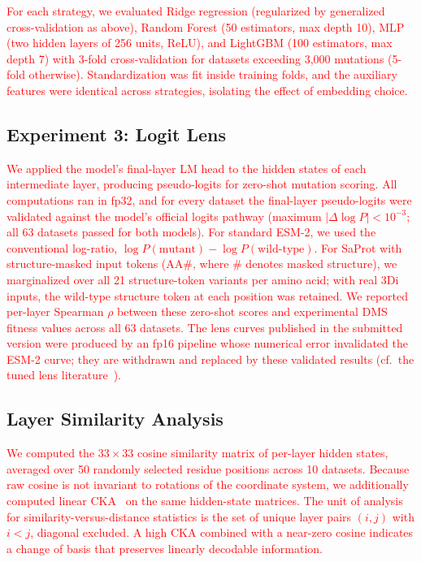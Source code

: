 \documentclass[numbered,webpdf,modern,large]{oup-authoring-template}
\newcommand{\rev}[1]{\textcolor{red}{#1}}
\begin{document}
\rev{For each strategy, we evaluated Ridge regression (regularized by generalized
cross-validation as above), Random Forest (50 estimators,
max depth 10), MLP (two hidden layers of 256 units, ReLU), and LightGBM (100 estimators,
max depth 7) with 3-fold cross-validation for datasets exceeding 3,000 mutations
(5-fold otherwise). Standardization was fit inside training folds, and the auxiliary
features were identical across strategies, isolating the effect of embedding choice.}

\subsection{Experiment 3: Logit Lens}

\rev{We applied the model's final-layer LM head to the hidden states of each
intermediate layer, producing pseudo-logits for zero-shot mutation scoring. All
computations ran in fp32, and for every dataset the final-layer pseudo-logits were
validated against the model's official logits pathway (maximum $|\Delta \log P| <
10^{-3}$; all 63 datasets passed for both models). For standard ESM-2, we used the
conventional log-ratio, $\log P(\text{mutant}) - \log P(\text{wild-type})$. For SaProt
with structure-masked input tokens ($\text{AA}\#$, where $\#$ denotes masked
structure), we marginalized over all 21 structure-token variants per amino acid; with
real 3Di inputs, the wild-type structure token at each position was retained. We
reported per-layer Spearman $\rho$ between these zero-shot scores and experimental
DMS fitness values across all 63 datasets. The lens curves published in the submitted
version were produced by an fp16 pipeline whose numerical error invalidated the ESM-2
curve; they are withdrawn and replaced by these validated results
(cf.\ the tuned lens literature~\cite{belrose2023eliciting}).}

\subsection{Layer Similarity Analysis}

\rev{We computed the $33 \times 33$ cosine similarity matrix of per-layer hidden states,
averaged over 50 randomly selected residue positions across 10 datasets. Because raw
cosine is not invariant to rotations of the coordinate system, we additionally computed
linear CKA~\cite{kornblith2019similarity} on the same hidden-state matrices. The unit
of analysis for similarity-versus-distance statistics is the set of unique layer pairs
$(i, j)$ with $i < j$, diagonal excluded. A high CKA combined with a near-zero cosine
indicates a change of basis that preserves linearly decodable information.}
\end{document}

